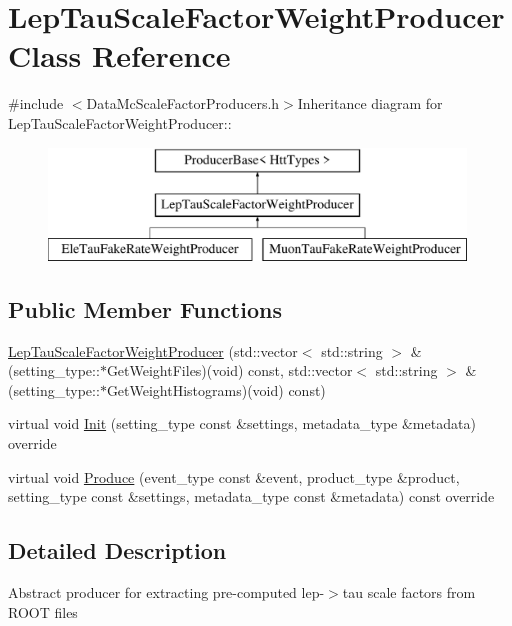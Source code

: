 \hypertarget{classLepTauScaleFactorWeightProducer}{
\section{LepTauScaleFactorWeightProducer Class Reference}
\label{classLepTauScaleFactorWeightProducer}
}


{\ttfamily \#include $<$DataMcScaleFactorProducers.h$>$}Inheritance diagram for LepTauScaleFactorWeightProducer::\begin{figure}[H]
\begin{center}
\leavevmode
\includegraphics[height=3cm]{classLepTauScaleFactorWeightProducer}
\end{center}
\end{figure}
\subsection*{Public Member Functions}
\begin{DoxyCompactItemize}
\item 
\hyperlink{classLepTauScaleFactorWeightProducer_a026aa4adc7d6d3368561d3fa1293497d}{LepTauScaleFactorWeightProducer} (std::vector$<$ std::string $>$ \&(setting\_\-type::$\ast$GetWeightFiles)(void) const, std::vector$<$ std::string $>$ \&(setting\_\-type::$\ast$GetWeightHistograms)(void) const)
\item 
virtual void \hyperlink{classLepTauScaleFactorWeightProducer_af9c92a38f08410dcd75fff6fc5b90312}{Init} (setting\_\-type const \&settings, metadata\_\-type \&metadata) override
\item 
virtual void \hyperlink{classLepTauScaleFactorWeightProducer_a576db6816f86e20dba770796d0b24cff}{Produce} (event\_\-type const \&event, product\_\-type \&product, setting\_\-type const \&settings, metadata\_\-type const \&metadata) const override
\end{DoxyCompactItemize}


\subsection{Detailed Description}
Abstract producer for extracting pre-\/computed lep-\/$>$tau scale factors from ROOT files 

